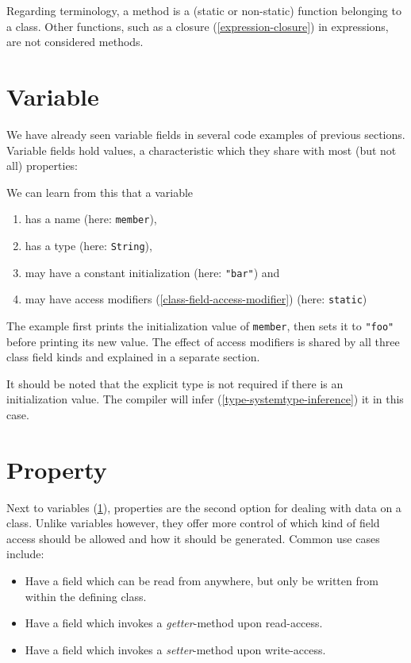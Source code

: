 \documentclass[a4paper,oneside]{book}
\newcommand{\type}[1]{\texttt{#1}}
\newcommand{\expr}[1]{\texttt{#1}}
\newcommand{\tref}[2]{#1 (\ref{#2})}
\newcommand{\haxe}[2][]{%
}
\begin{document}
Regarding terminology, a method is a (static or non-static) function belonging to a class. Other functions, such as a \tref{closure}{expression-closure} in expressions, are not considered methods.


\section{Variable}
\label{class-field-variable}

We have already seen variable fields in several code examples of previous sections. Variable fields hold values, a characteristic which they share with most (but not all) properties:

\haxe{assets/VariableField.hx}
We can learn from this that a variable

\begin{enumerate}
	\item has a name (here: \expr{member}),
	\item has a type (here: \type{String}),
	\item may have a constant initialization (here: \expr{"bar"}) and
	\item may have \tref{access modifiers}{class-field-access-modifier} (here: \expr{static})
\end{enumerate}
The example first prints the initialization value of \expr{member}, then sets it to \expr{"foo"} before printing its new value. The effect of access modifiers is shared by all three class field kinds and explained in a separate section.

It should be noted that the explicit type is not required if there is an initialization value. The compiler will \tref{infer}{type-systemtype-inference} it in this case.




\section{Property}
\label{class-field-property}

Next to \tref{variables}{class-field-variable}, properties are the second option for dealing with data on a class. Unlike variables however, they offer more control of which kind of field access should be allowed and how it should be generated. Common use cases include:

\begin{itemize}
	\item Have a field which can be read from anywhere, but only be written from within the defining class.
	\item Have a field which invokes a \emph{getter}-method upon read-access.
	\item Have a field which invokes a \emph{setter}-method upon write-access.
\end{itemize}
\end{document}
